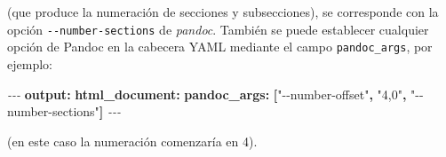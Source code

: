 \documentclass[
]{book}
\newenvironment{Shaded}{\begin{snugshade}}{\end{snugshade}}
\newcommand{\AttributeTok}[1]{\textcolor[rgb]{0.13,0.29,0.53}{#1}}
\newcommand{\FunctionTok}[1]{\textcolor[rgb]{0.13,0.29,0.53}{\textbf{#1}}}
\newcommand{\KeywordTok}[1]{\textcolor[rgb]{0.13,0.29,0.53}{\textbf{#1}}}
\newcommand{\PreprocessorTok}[1]{\textcolor[rgb]{0.56,0.35,0.01}{\textit{#1}}}
\newcommand{\StringTok}[1]{\textcolor[rgb]{0.31,0.60,0.02}{#1}}
\theoremstyle{break}
\theoremstyle{nonumberplain}
\begin{document}
(que produce la numeración de secciones y subsecciones),
se corresponde con la opción \texttt{-\/-number-sections} de \emph{pandoc}.
También se puede establecer cualquier opción de Pandoc en la cabecera YAML
mediante el campo \texttt{pandoc\_args}, por ejemplo:

\begin{Shaded}
\begin{Highlighting}[]
\PreprocessorTok{{-}{-}{-}}
\FunctionTok{output}\KeywordTok{:}
\AttributeTok{  }\FunctionTok{html\_document}\KeywordTok{:}\AttributeTok{ }
\AttributeTok{    }\FunctionTok{pandoc\_args}\KeywordTok{:}\AttributeTok{ }\KeywordTok{[}\StringTok{"{-}{-}number{-}offset"}\KeywordTok{,}\AttributeTok{ }\StringTok{"4,0"}\KeywordTok{,}\AttributeTok{ }\StringTok{"{-}{-}number{-}sections"}\KeywordTok{]}\AttributeTok{      }
\PreprocessorTok{{-}{-}{-}}
\end{Highlighting}
\end{Shaded}

(en este caso la numeración comenzaría en 4).


\end{document}

